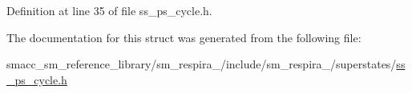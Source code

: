 Definition at line 35 of file ss\+\_\+ps\+\_\+cycle.\+h.



The documentation for this struct was generated from the following file\+:\begin{DoxyCompactItemize}
\item 
smacc\+\_\+sm\+\_\+reference\+\_\+library/sm\+\_\+respira\+\_/include/sm\+\_\+respira\+\_/superstates/\hyperlink{ss__ps__cycle_8h}{ss\+\_\+ps\+\_\+cycle.\+h}\end{DoxyCompactItemize}
